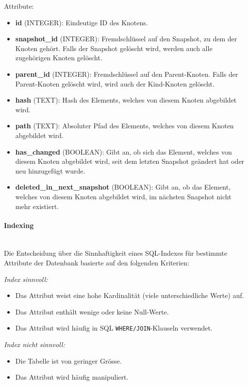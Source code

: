 \documentclass[a4paper,12pt]{report}
\begin{document}
    Attribute:
    \begin{itemize}
        \item \textbf{id} (INTEGER): Eindeutige ID des Knotens.
        \item \textbf{snapshot\_id} (INTEGER): Fremdschlüssel auf den Snapshot, zu dem der Knoten gehört.
        Falls der Snapshot gelöscht wird, werden auch alle zugehörigen Knoten gelöscht.
        \item \textbf{parent\_id} (INTEGER): Fremdschlüssel auf den Parent-Knoten.
        Falls der Parent-Knoten gelöscht wird, wird auch der Kind-Knoten gelöscht.
        \item \textbf{hash} (TEXT): Hash des Elements, welches von diesem Knoten abgebildet wird.
        \item \textbf{path} (TEXT): Absoluter Pfad des Elements, welches von diesem Knoten abgebildet wird.
        \item \textbf{has\_changed} (BOOLEAN): Gibt an, ob sich das Element, welches von diesem Knoten abgebildet wird,
        seit dem letzten Snapshot geändert hat oder neu hinzugefügt wurde.
        \item \textbf{deleted\_in\_next\_snapshot} (BOOLEAN): Gibt an, ob das Element, welches von diesem Knoten abgebildet wird,
        im nächsten Snapshot nicht mehr existiert.
    \end{itemize}

    \paragraph*{Indexing}\mbox{}\\
    Die Entscheidung über die Sinnhaftigkeit eines SQL-Indexes für bestimmte Attribute der Datenbank basierte auf den folgenden Kriterien:

    \textit{Index sinnvoll:}
    \begin{itemize}
        \item Das Attribut weist eine hohe Kardinalität (viele unterschiedliche Werte) auf.
        \item Das Attribut enthält wenige oder keine Null-Werte.
        \item Das Attribut wird häufig in SQL \texttt{WHERE/JOIN}-Klauseln verwendet.
    \end{itemize}

    \textit{Index nicht sinnvoll:}
    \begin{itemize}
        \item Die Tabelle ist von geringer Grösse.
        \item Das Attribut wird häufig manipuliert.
    \end{itemize}
\end{document}
